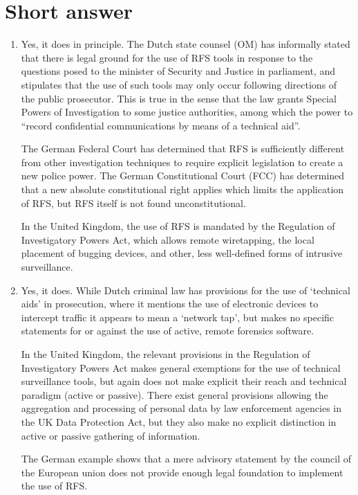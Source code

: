 \documentclass[11pt]{article} %
\begin{document}
\section{Short answer}
\begin{enumerate}
\item{Yes, it does in principle.
The Dutch state counsel (OM) has informally stated that there is legal ground for the use of RFS tools in response to the questions posed to the minister of Security and Justice in parliament, and stipulates that the use of such tools may only occur following directions of the public prosecutor. \cite{webwereld}
This is true in the sense that the law grants Special Powers of Investigation to some justice authorities, among which the power to ``record confidential communications by means of a technical aid''. \cite{bob}

The German Federal Court has determined that RFS is sufficiently different from other investigation techniques to require explicit legislation to create a new police power.
The German Constitutional Court (FCC) has determined that a new absolute constitutional right applies which limits the application of RFS, but RFS itself is not found unconstitutional.

In the United Kingdom, the use of RFS is mandated by the Regulation of Investigatory Powers Act, which allows remote wiretapping, the local placement of bugging devices, and other, less well-defined forms of intrusive surveillance. \cite{regul_invest}
}

\item{Yes, it does.
While Dutch criminal law has provisions for the use of `technical aids' in prosecution, where it mentions the use of electronic devices to intercept traffic it appears to mean a `network tap', but makes no specific statements for or against the use of active, remote forensics software.

In the United Kingdom, the relevant provisions in the Regulation of Investigatory Powers Act makes general exemptions for the use of technical surveillance tools, but again does not make explicit their reach and technical paradigm (active or passive).
There exist general provisions allowing the aggregation and processing of personal data by law enforcement agencies in the UK Data Protection Act, but they also make no explicit distinction in active or passive gathering of information.

The German example shows that a mere advisory statement by the council of the European union does not provide enough legal foundation to implement the use of RFS.
}
\end{enumerate}
\end{document}
